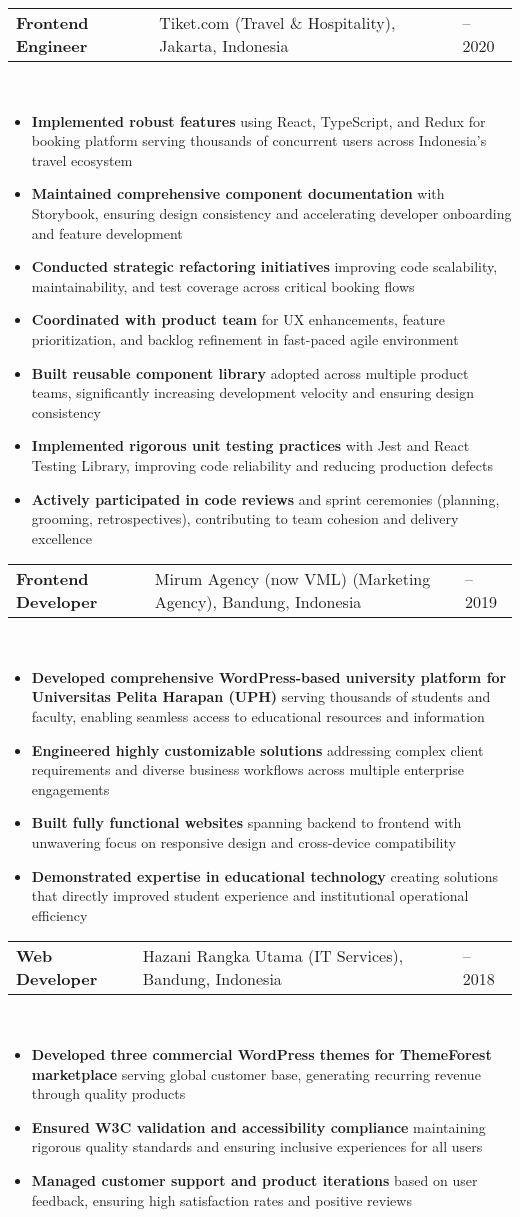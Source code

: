 \documentclass[a4paper, 11pt]{article}
\newcommand{\resumeItem}[1]{
  \item\small{
    {#1 \vspace{-2pt}}
  }
}
\newcommand{\resumeSubheading}[4]{
  \vspace{-2pt}\item
    \begin{tabularx}{0.987\textwidth}[t]{
  >{\raggedright\arraybackslash}X
  >{\centering\arraybackslash}X
  >{\raggedleft\arraybackslash}X }
      \textbf{#1} & #2 & #3 \\
    \end{tabularx}
    \textit{\small#4}\\
    \vspace{-7pt}
}
\newcommand{\resumeItemListStart}{\begin{itemize}[leftmargin=0.22in]}
\newcommand{\resumeItemListEnd}{\end{itemize}\vspace{-20pt}}
\begin{document}
        \resumeSubheading
            {Frontend Engineer}{Tiket.com (Travel \& Hospitality), Jakarta, Indonesia}{2019 -- 2020}{}
            \resumeItemListStart
                \resumeItem{\textbf{Implemented robust features} using React, TypeScript, and Redux for booking platform serving thousands of concurrent users across Indonesia's travel ecosystem}
                \resumeItem{\textbf{Maintained comprehensive component documentation} with Storybook, ensuring design consistency and accelerating developer onboarding and feature development}
                \resumeItem{\textbf{Conducted strategic refactoring initiatives} improving code scalability, maintainability, and test coverage across critical booking flows}
                \resumeItem{\textbf{Coordinated with product team} for UX enhancements, feature prioritization, and backlog refinement in fast-paced agile environment}
                \resumeItem{\textbf{Built reusable component library} adopted across multiple product teams, significantly increasing development velocity and ensuring design consistency}
                \resumeItem{\textbf{Implemented rigorous unit testing practices} with Jest and React Testing Library, improving code reliability and reducing production defects}
                \resumeItem{\textbf{Actively participated in code reviews} and sprint ceremonies (planning, grooming, retrospectives), contributing to team cohesion and delivery excellence}
            \resumeItemListEnd

        \resumeSubheading
            {Frontend Developer}{Mirum Agency (now VML) (Marketing Agency), Bandung, Indonesia}{2018 -- 2019}{}
            \resumeItemListStart
                \resumeItem{\textbf{Developed comprehensive WordPress-based university platform for Universitas Pelita Harapan (UPH)} serving thousands of students and faculty, enabling seamless access to educational resources and information}
                \resumeItem{\textbf{Engineered highly customizable solutions} addressing complex client requirements and diverse business workflows across multiple enterprise engagements}
                \resumeItem{\textbf{Built fully functional websites} spanning backend to frontend with unwavering focus on responsive design and cross-device compatibility}
                \resumeItem{\textbf{Demonstrated expertise in educational technology} creating solutions that directly improved student experience and institutional operational efficiency}
            \resumeItemListEnd

        \resumeSubheading
            {Web Developer}{Hazani Rangka Utama (IT Services), Bandung, Indonesia}{2017 -- 2018}{}
            \resumeItemListStart
                \resumeItem{\textbf{Developed three commercial WordPress themes for ThemeForest marketplace} serving global customer base, generating recurring revenue through quality products}
                \resumeItem{\textbf{Ensured W3C validation and accessibility compliance} maintaining rigorous quality standards and ensuring inclusive experiences for all users}
                \resumeItem{\textbf{Managed customer support and product iterations} based on user feedback, ensuring high satisfaction rates and positive reviews}
            \resumeItemListEnd
\end{document}

